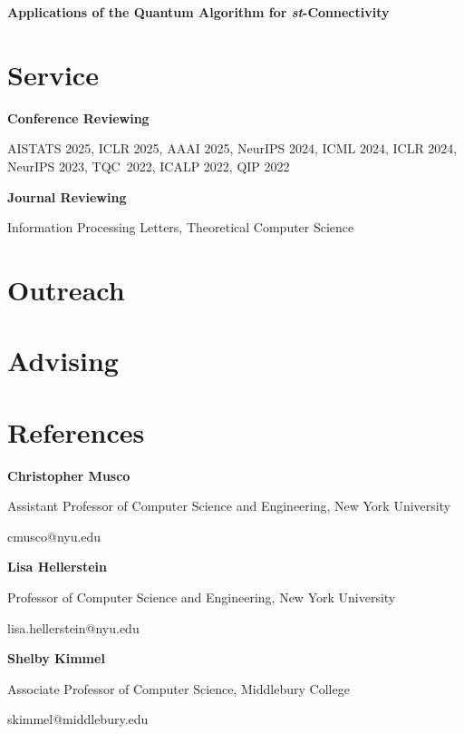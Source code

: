 \documentclass[11pt,a4paper,sans]{moderncv}
\begin{document}

\textbf{Applications of the Quantum Algorithm for \textit{st}-Connectivity}


\section{Service}

\textbf{Conference Reviewing}

AISTATS 2025, ICLR 2025, AAAI 2025, NeurIPS 2024, ICML 2024, ICLR 2024, NeurIPS 2023, TQC~2022, ICALP 2022, QIP 2022

\textbf{Journal Reviewing}

Information Processing Letters, Theoretical Computer Science

\section{Outreach}


\section{Advising}





\section{References}

\textbf{Christopher Musco}

Assistant Professor of Computer Science and Engineering, New York University

cmusco@nyu.edu

\vspace{1em}

\textbf{Lisa Hellerstein}

Professor of Computer Science and Engineering, New York University

lisa.hellerstein@nyu.edu

\vspace{1em}

\textbf{Shelby Kimmel}

Associate Professor of Computer Science, Middlebury College

skimmel@middlebury.edu
\end{document}
